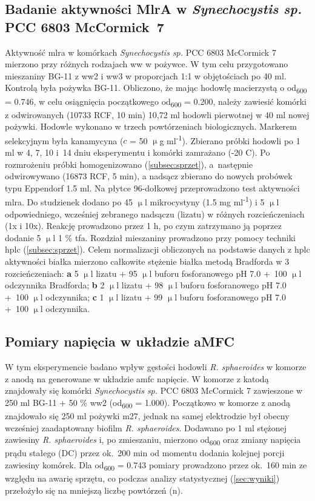 \subsection{Badanie aktywności MlrA w \textit{Synechocystis sp.} PCC 6803 McCormick~7}\label{subsec:mlra}
Aktywność \acrshort{mlra} w komórkach
\textit{Synechocystis sp.} PCC 6803 McCormick 7 mierzono przy
różnych rodzajach \acrshort{ww} w pożywce.
W tym celu przygotowano mieszaniny BG-11 z \acrshort{ww}2 i \acrshort{ww}3
w proporcjach 1:1 w objętościach po 40 ml.
Kontrolą była pożywka BG-11.
Obliczono, że mając hodowlę macierzystą
o \acrshort{od}\textsubscript{600} = 0.746, w celu osiągnięcia
początkowego \acrshort{od}\textsubscript{600} = 0.200, należy zawiesić
komórki z odwirowanych (10733 RCF, 10 min) 10,72 ml hodowli
pierwotnej w 40 ml nowej pożywki.
Hodowle wykonano w trzech powtórzeniach biologicznych.
Markerem selekcyjnym była kanamycyna ($c$ = 50 $\upmu$g ml\textsuperscript{-1}).
Zbierano próbki hodowli po 1 ml w 4, 7, 10 i~14 dniu eksperymentu
i komórki zamrażano (-20 \degree C).
Po rozmrożeniu próbki homogenizowano (\ref{subsec:sprzet}),
a~następnie odwirowywano (16873 RCF, 5 min), a nadsącz
zbierano do nowych probówek typu Eppendorf 1.5 ml.
Na płytce 96-dołkowej przeprowadzono test aktywności \acrshort{mlra}\@.
Do studzienek dodano po 45 $\upmu$l mikrocystyny (1.5 mg ml\textsuperscript{-1})
i 5 $\upmu$l odpowiedniego, wcześniej zebranego nadsączu (lizatu)
w różnych rozcieńczeniach (1x i 10x).
Reakcję prowadzono przez 1 h, po czym zatrzymano ją
poprzez dodanie 5 $\upmu$l 1 \% \acrshort{tfa}\@.
Rozdział mieszaniny prowadzono przy pomocy techniki \acrshort{hplc} (\ref{subsec:sprzet}).
Celem normalizacji obliczonych na podstawie danych z \acrshort{hplc} aktywności białka
mierzono całkowite stężenie białka metodą Bradforda w 3 rozcieńczeniach:
\textbf{a} 5 $\upmu$l lizatu + 95 $\upmu$l buforu fosforanowego pH 7.0
+~100 $\upmu$l odczynnika Bradforda; \textbf{b} 2 $\upmu$l lizatu
+ 98 $\upmu$l buforu fosforanowego pH 7.0 +~100 $\upmu$l odczynnika;
\textbf{c} 1 $\upmu$l lizatu + 99 $\upmu$l buforu fosforanowego pH 7.0 +~100
$\upmu$l odczynnika.

\subsection{Pomiary napięcia w układzie aMFC}\label{subsec:volt}
W tym eksperymencie badano wpływ gęstości hodowli
\textit{R. sphaeroides} w komorze z anodą na generowane
w układzie \acrshort{amfc} napięcie.
W komorze z katodą znajdowały się komórki
\textit{Synechocystis sp.} PCC 6803 McCormick 7
zawieszone w 250 ml BG-11 + 50 \% \acrshort{ww}2
(\acrshort{od}\textsubscript{600} = 1.000).
Początkowo w komorze z anodą znajdowało się 250 ml
pożywki \acrshort{m27}, jednak na samej elektrodzie był
obecny wcześniej zaadaptowany biofilm \textit{R. sphaeroides}.
Dodawano po 1 ml stężonej zawiesiny \textit{R. sphaeroides}
i, po zmieszaniu, mierzono \acrshort{od}\textsubscript{600} oraz
zmiany napięcia prądu stałego (DC) przez ok.\ 200 min od
momentu dodania kolejnej porcji zawiesiny komórek.
Dla \acrshort{od}\textsubscript{600} = 0.743 pomiary prowadzono
przez ok.\ 160 min ze względu na awarię sprzętu, co podczas
analizy statystycznej (\ref{sec:wyniki}) przełożyło się
na mniejszą liczbę powtórzeń (n).